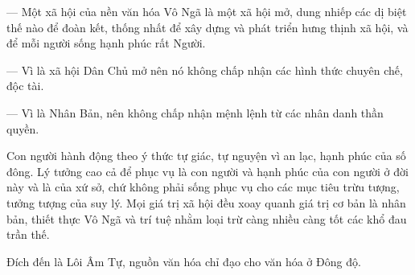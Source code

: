 — Một xã hội của nền văn hóa Vô Ngã là một xã hội mở, dung nhiếp các dị biệt thế nào để đoàn kết, thống nhất để xây dựng và phát triển hưng thịnh xã hội, và để mỗi người sống hạnh phúc rất Người.

— Vì là xã hội Dân Chủ mở nên nó không chấp nhận các hình thức chuyên chế, độc tài.

— Vì là Nhân Bản, nên không chấp nhận mệnh lệnh từ các nhân danh thần quyền.

Con người hành động theo ý thức tự giác, tự nguyện vì an lạc, hạnh phúc của số đông. Lý tưởng cao cả để phục vụ là con người và hạnh phúc của con người ở đời này và là của xứ sở, chứ không phải sống phục vụ cho các mục tiêu trừu tượng, tưởng tượng của suy lý. Mọi giá trị xã hội đều xoay quanh giá trị cơ bản là nhân bản, thiết thực Vô Ngã và trí tuệ nhằm loại trừ càng nhiều càng tốt các khổ đau trần thế.

Đích đến là Lôi Âm Tự, nguồn văn hóa chỉ đạo cho văn hóa ở Đông độ.
